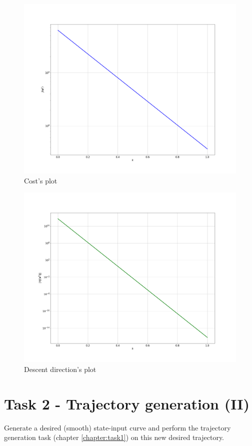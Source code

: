 \documentclass[a4paper,11pt,oneside]{book}
\begin{document}
\begin{figure}[!ht]
    \centering
    \includegraphics[scale=.20]{figs/Task1/cost}
    \caption{Cost's plot}
    \label{fig:cost}
\end{figure}
\begin{figure}[!ht]
    \centering
    \includegraphics[scale=.20]{figs/Task1/descent_direction}
    \caption{Descent direction's plot}
    \label{fig:desc_dir}
\end{figure}

\chapter{Task 2 - Trajectory generation (II)}\label{chapter:task2}
Generate a desired (smooth) state-input curve and perform the trajectory generation task (chapter \ref{chapter:task1}) on this new desired trajectory.\\
\end{document}

